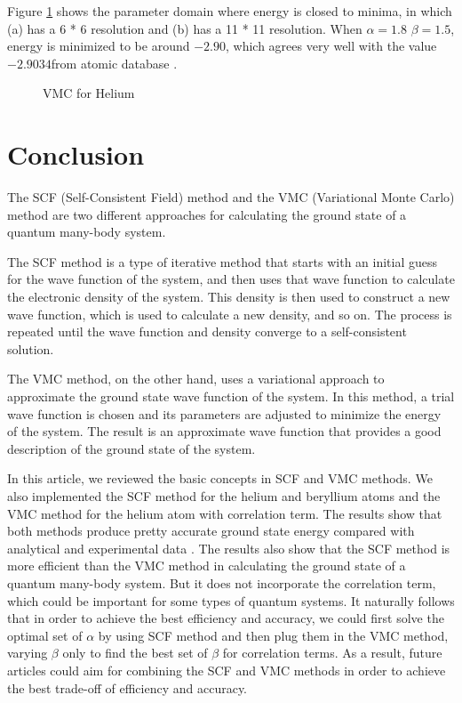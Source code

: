 \documentclass[11pt]{article}
\begin{document}
Figure \ref{fig:vmc-he-with-correlation} shows the parameter domain where energy is closed to minima, in which (a) has a 6 * 6 resolution and (b) has a 11 * 11 resolution. When $\alpha=1.8$ $\beta=1.5$, energy is minimized to be around $-2.90$, which agrees very well with the value $-2.9034$from atomic database \cite{database-he}. 

\begin{figure}
    \centering
    \qquad
    \caption{VMC for Helium}%
    \label{fig:vmc-he-with-correlation}%
\end{figure}


\section{Conclusion}
The SCF (Self-Consistent Field) method and the VMC (Variational Monte Carlo) method are two different approaches for calculating the ground state of a quantum many-body system.

The SCF method is a type of iterative method that starts with an initial guess for the wave function of the system, and then uses that wave function to calculate the electronic density of the system. This density is then used to construct a new wave function, which is used to calculate a new density, and so on. The process is repeated until the wave function and density converge to a self-consistent solution.

The VMC method, on the other hand, uses a variational approach to approximate the ground state wave function of the system. In this method, a trial wave function is chosen and its parameters are adjusted to minimize the energy of the system. The result is an approximate wave function that provides a good description of the ground state of the system.

In this article, we reviewed the basic concepts in SCF and VMC methods. We also implemented the SCF method for the helium and beryllium atoms and the VMC method for the helium atom with correlation term. The results show that both methods produce pretty accurate ground state energy compared with analytical and experimental data \cite{analytical_variatonal_He} \cite{Be-perturbation} \cite{database-he}. The results also show that the SCF method is more efficient than the VMC method in calculating the ground state of a quantum many-body system. But it does not incorporate the correlation term, which could be important for some types of quantum systems. It naturally follows that in order to achieve the best efficiency and accuracy, we could first solve the optimal set of $\alpha$ by using SCF method and then plug them in the VMC method, varying $\beta$ only to find the best set of $\beta$ for correlation terms. As a result, future articles could aim for combining the SCF and VMC methods in order to achieve the best trade-off of efficiency and accuracy.

\printbibliography %
\end{document}
